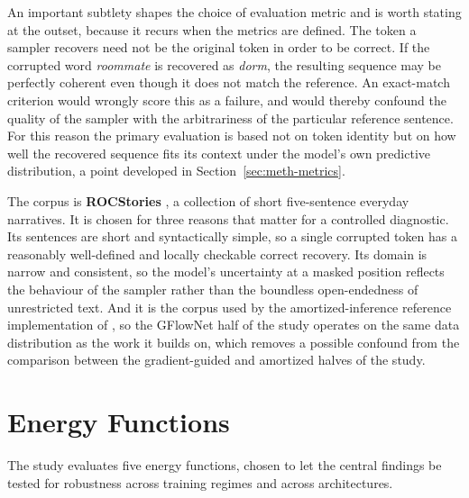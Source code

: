 An important subtlety shapes the choice of evaluation metric and is worth stating at the outset, because it recurs when the metrics are defined. The token a sampler recovers need not be the original token in order to be correct. If the corrupted word \emph{roommate} is recovered as \emph{dorm}, the resulting sequence may be perfectly coherent even though it does not match the reference. An exact-match criterion would wrongly score this as a failure, and would thereby confound the quality of the sampler with the arbitrariness of the particular reference sentence. For this reason the primary evaluation is based not on token identity but on how well the recovered sequence fits its context under the model's own predictive distribution, a point developed in Section~\ref{sec:meth-metrics}.

The corpus is \textbf{ROCStories} \citep{mostafazadeh2016corpus}, a collection of short five-sentence everyday narratives. It is chosen for three reasons that matter for a controlled diagnostic. Its sentences are short and syntactically simple, so a single corrupted token has a reasonably well-defined and locally checkable correct recovery. Its domain is narrow and consistent, so the model's uncertainty at a masked position reflects the behaviour of the sampler rather than the boundless open-endedness of unrestricted text. And it is the corpus used by the amortized-inference reference implementation of \citet{hu2024amortizing}, so the GFlowNet half of the study operates on the same data distribution as the work it builds on, which removes a possible confound from the comparison between the gradient-guided and amortized halves of the study.

\section{Energy Functions}
\label{sec:meth-models}

The study evaluates five energy functions, chosen to let the central findings be tested for robustness across training regimes and across architectures.

